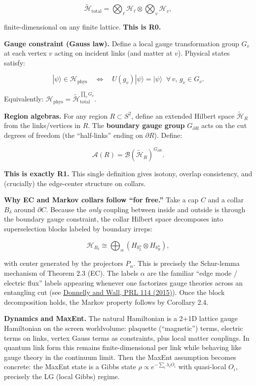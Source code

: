 \documentclass[11pt,a4paper]{article}
\theoremstyle{remark}
\begin{document}
\[
\tilde{\mathcal{H}}_{\mathrm{total}} = \bigotimes_\ell \mathcal{H}_\ell \otimes \bigotimes_v \mathcal{H}_v,
\]

finite-dimensional on any finite lattice. \textbf{This is R0.}

\textbf{Gauge constraint (Gauss law).} Define a local gauge transformation group
\(G_v\) at each vertex \(v\) acting on incident links (and matter at \(v\)). Physical
states satisfy:

\[
|\psi\rangle \in \mathcal{H}_{\mathrm{phys}} \quad\Longleftrightarrow\quad U(g_v)|\psi\rangle = |\psi\rangle \;\;\forall\, v,\, g_v \in G_v.
\]

Equivalently: \(\mathcal{H}_{\mathrm{phys}} = \tilde{\mathcal{H}}_{\mathrm{total}}^{\prod_v G_v}\).

\textbf{Region algebras.} For any region \(R \subset S^2\), define an extended Hilbert
space \(\tilde{\mathcal{H}}_R\) from the links/vertices in \(R\). The \textbf{boundary
gauge group} \(G_{\partial R}\) acts on the cut degrees of freedom (the
``half-links'' ending on \(\partial R\)). Define:

\[
\mathcal{A}(R) = \mathcal{B}(\tilde{\mathcal{H}}_R)^{G_{\partial R}}.
\]

\textbf{This is exactly R1.} This single definition gives isotony, overlap
consistency, and (crucially) the edge-center structure on collars.

\textbf{Why EC and Markov collars follow ``for free.''} Take a cap \(C\) and a collar
\(B_\delta\) around \(\partial C\). Because the \emph{only} coupling between inside
and outside is through the boundary gauge constraint, the collar Hilbert
space decomposes into superselection blocks labeled by boundary irreps:

\[
\mathcal{H}_{B_\delta} \cong \bigoplus_\alpha (H_{b_L^\alpha} \otimes H_{b_R^\alpha}),
\]

with center generated by the projectors \(P_\alpha\). This is precisely the
Schur-lemma mechanism of Theorem 2.3 (EC). The labels \(\alpha\) are the
familiar ``edge mode / electric flux'' labels appearing whenever one
factorizes gauge theories across an entangling cut (see
\href{https://link.aps.org/doi/10.1103/PhysRevLett.114.111603}{Donnelly and Wall, PRL 114 (2015)}).
Once the block decomposition holds, the Markov property follows by
Corollary 2.4.

\textbf{Dynamics and MaxEnt.} The natural Hamiltonian is a 2+1D lattice gauge
Hamiltonian on the screen worldvolume: plaquette (``magnetic'') terms, electric
terms on links, vertex Gauss terms as constraints, plus local matter couplings.
In quantum link form this remains finite-dimensional per link while behaving
like gauge theory in the continuum limit. Then the MaxEnt assumption becomes
concrete: the MaxEnt state is a Gibbs state \(\rho \propto e^{-\sum_i \lambda_i O_i}\)
with quasi-local \(O_i\), precisely the LG (local Gibbs) regime.
\end{document}
